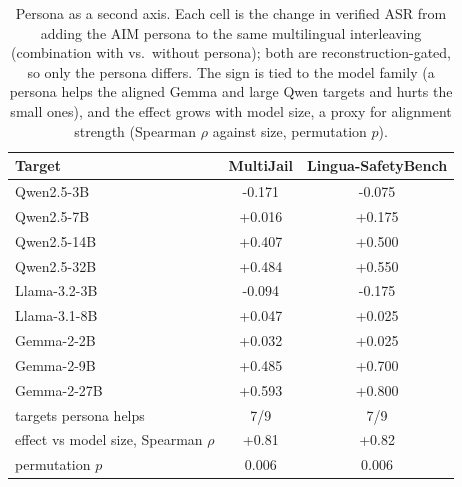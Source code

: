 \begin{table}[t]
\centering
\small
\caption{Persona as a second axis. Each cell is the change in verified ASR from adding the AIM persona to the same multilingual interleaving (combination with vs.\ without persona); both are reconstruction-gated, so only the persona differs. The sign is tied to the model family (a persona helps the aligned Gemma and large Qwen targets and hurts the small ones), and the effect grows with model size, a proxy for alignment strength (Spearman $\rho$ against size, permutation $p$).}
\label{tab:sel_persona}
\begin{tabular}{lcc}
\toprule
Target & MultiJail & Lingua-SafetyBench \\
\midrule
Qwen2.5-3B & -0.171 & -0.075 \\
Qwen2.5-7B & +0.016 & +0.175 \\
Qwen2.5-14B & +0.407 & +0.500 \\
Qwen2.5-32B & +0.484 & +0.550 \\
Llama-3.2-3B & -0.094 & -0.175 \\
Llama-3.1-8B & +0.047 & +0.025 \\
Gemma-2-2B & +0.032 & +0.025 \\
Gemma-2-9B & +0.485 & +0.700 \\
Gemma-2-27B & +0.593 & +0.800 \\
\midrule
targets persona helps & 7/9 & 7/9 \\
effect vs model size, Spearman $\rho$ & +0.81 & +0.82 \\
permutation $p$ & 0.006 & 0.006 \\
\bottomrule
\end{tabular}
\end{table}
